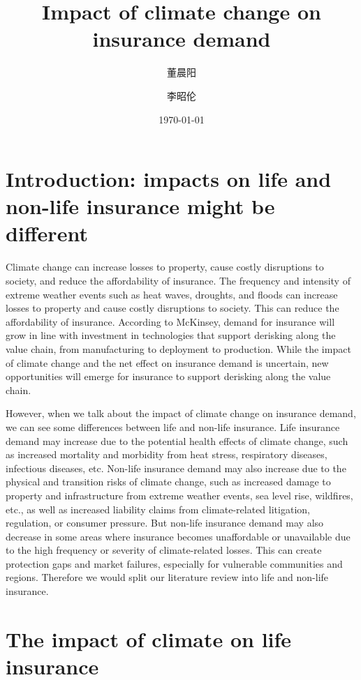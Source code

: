\documentclass[a4paper,12pt]{article}
\title{Impact of climate change on insurance demand}
\author{董晨阳\and 李昭伦}
\date{\today}
\begin{document}
\maketitle
\tableofcontents
\clearpage
\section{Introduction: impacts on life and non-life insurance might be different}
Climate change can increase losses to property, cause costly disruptions to society, and reduce the affordability of insurance. The frequency and intensity of extreme weather events such as heat waves, droughts, and floods can increase losses to property and cause costly disruptions to society. This can reduce the affordability of insurance. According to McKinsey, demand for insurance will grow in line with investment in technologies that support derisking along the value chain, from manufacturing to deployment to production. While the impact of climate change and the net effect on insurance demand is uncertain, new opportunities will emerge for insurance to support derisking along the value chain.

However, when we talk about the impact of climate change on insurance demand, we can see some differences between life and non-life insurance. Life insurance demand may increase due to the potential health effects of climate change, such as increased mortality and morbidity from heat stress, respiratory diseases, infectious diseases, etc. Non-life insurance demand may also increase due to the physical and transition risks of climate change, such as increased damage to property and infrastructure from extreme weather events, sea level rise, wildfires, etc., as well as increased liability claims from climate-related litigation, regulation, or consumer pressure. But non-life insurance demand may also decrease in some areas where insurance becomes unaffordable or unavailable due to the high frequency or severity of climate-related losses. This can create protection gaps and market failures, especially for vulnerable communities and regions. Therefore we would split our literature review into life and non-life insurance.


\section{The impact of climate on life insurance}
\end{document}
